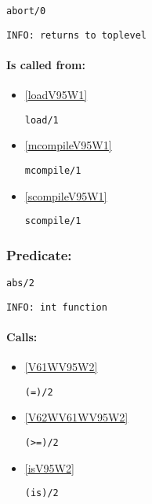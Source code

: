 \begin{verbatim}
abort/0
\end{verbatim}

{\small \begin{verbatim}
INFO: returns to toplevel

\end{verbatim}}
\paragraph{Is called from:} 
\begin{itemize}
\item \ref{loadV95W1} 
\begin{verbatim}
load/1
\end{verbatim}

\item \ref{mcompileV95W1} 
\begin{verbatim}
mcompile/1
\end{verbatim}

\item \ref{scompileV95W1} 
\begin{verbatim}
scompile/1
\end{verbatim}

\end{itemize}

\subsubsection{Predicate:} \label{absV95W2}

\begin{verbatim}
abs/2
\end{verbatim}

{\small \begin{verbatim}
INFO: int function

\end{verbatim}}
\paragraph{Calls:} 
\begin{itemize}
\item \ref{V61WV95W2} 
\begin{verbatim}
(=)/2
\end{verbatim}

\item \ref{V62WV61WV95W2} 
\begin{verbatim}
(>=)/2
\end{verbatim}

\item \ref{isV95W2} 
\begin{verbatim}
(is)/2
\end{verbatim}

\end{itemize}

